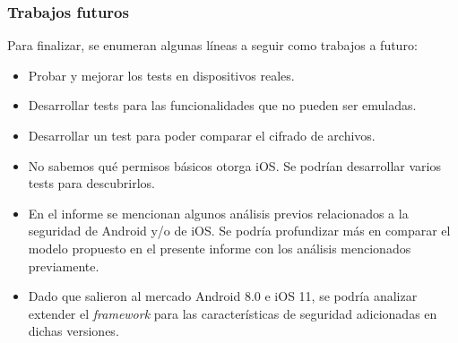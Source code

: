 \begin{frame}
 \frametitle{Trabajos futuros}
Para finalizar, se enumeran algunas líneas a seguir como trabajos a futuro:\pause
 \begin{small}
 \begin{itemize}[<+->]
    \item Probar y mejorar los tests en dispositivos reales.
    \item Desarrollar tests para las funcionalidades que no pueden ser emuladas.
    \item Desarrollar un test para poder comparar el cifrado de archivos.
    \item No sabemos qué permisos básicos otorga iOS. Se podrían desarrollar varios tests para descubrirlos.
    \item En el informe se mencionan algunos análisis previos relacionados a la seguridad de Android y/o de iOS. Se podría profundizar más en comparar el modelo propuesto en el presente informe con los análisis mencionados previamente.
    \item Dado que salieron al mercado Android 8.0 e iOS 11, se podría analizar extender el \emph{framework} para las características de seguridad adicionadas en dichas versiones.
 \end{itemize}
 \end{small}
\end{frame}


